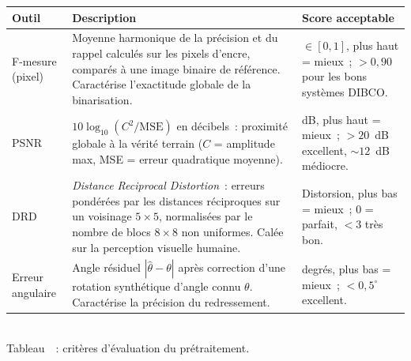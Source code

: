 \documentclass[a4paper,10pt]{article}
\begin{document}
\begin{center}
\label{tab:pretrait}%
\begin{tabular}{@{}p{2.6cm} p{8.9cm} p{3.4cm}@{}}
\hline
\textbf{Outil} & \textbf{Description} & \textbf{Score acceptable} \\
\hline
F-mesure (pixel) & Moyenne harmonique de la précision et du rappel calculés sur les pixels d'encre, comparés à une image binaire de référence. Caractérise l'exactitude globale de la binarisation. & $\in[0,1]$, plus haut = mieux~; $>0{,}90$ pour les bons systèmes DIBCO. \\
\hline
PSNR & $10\log_{10}(C^2/\mathrm{MSE})$ en décibels~: proximité globale à la vérité terrain ($C$ = amplitude max, MSE = erreur quadratique moyenne). & dB, plus haut = mieux~; $>20$~dB excellent, $\sim12$~dB médiocre. \\
\hline
DRD & \emph{Distance Reciprocal Distortion}~: erreurs pondérées par les distances réciproques sur un voisinage $5\times5$, normalisées par le nombre de blocs $8\times8$ non uniformes. Calée sur la perception visuelle humaine. & Distorsion, plus bas = mieux~; $0$ = parfait, $<3$ très bon. \\
\hline
Erreur angulaire & Angle résiduel $|\hat\theta-\theta|$ après correction d'une rotation synthétique d'angle connu $\theta$. Caractérise la précision du redressement. & degrés, plus bas = mieux~; $<0{,}5^{\circ}$ excellent. \\
\hline
\end{tabular}\\[3pt]
Tableau~\thetable~: critères d'évaluation du prétraitement.
\end{center}
\end{document}
